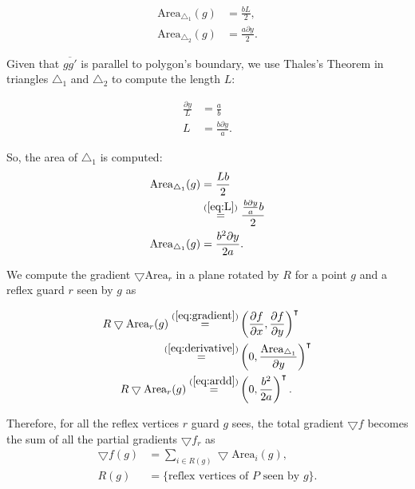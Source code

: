 \begin{align*}
    \text{Area}_{\triangle_1}(g) &= \frac{b L}{2},\\ 
    \text{Area}_{\triangle_2}(g) &= \frac{a \partial y}{2}.
\end{align*}


Given that $\overline{gg'}$ is parallel to polygon's boundary, we  use Thales's Theorem \cite{allman1889greek} in triangles $\triangle_1$ and $\triangle_2$ to compute the length $L$: 

\begin{align}
    \frac{\partial y}{L} &= \frac a b \nonumber \\ 
    L &= \frac{b \partial y}{a}. \label{eq:L}
\end{align}

So, the area of $\triangle_1$ is computed:
\begin{align}
    \text{Area}_{\triangle_1}(g) &= \frac{Lb}{2} \nonumber \\ 
    &\overset{(\ref{eq:L})}{=} \frac{\frac{b \partial y}{a}b}{2} \nonumber \\ 
    \text{Area}_{\triangle_1}(g) &= \frac{b^2 \partial y}{2a}. \label{eq:ardd}
\end{align}

We compute the gradient $\bigtriangledown \text{Area}_r$ in a plane rotated by $R$ for a point $g$ and a reflex guard $r$ seen by $g$ as

\begin{align}
    R\bigtriangledown \text{Area}_r(g) \overset{(\ref{eq:gradient})}{=} &\left(\frac{\partial f}{\partial x}, \frac{\partial f}{\partial y}\right)^\intercal \nonumber \\
    \overset{(\ref{eq:derivative})}{=} &\left(0, \frac{\text{Area}_{\triangle_1}}{\partial y}\right)^\intercal \nonumber \\
    R\bigtriangledown \text{Area}_r(g) \overset{(\ref{eq:ardd})}{=} &\left(0, \frac{b^2}{2a}\right)^\intercal. \label{eq:normf1}
\end{align}


Therefore, for all the reflex vertices $r$ guard $g$ sees, the total gradient $\bigtriangledown f$ becomes the sum of all the partial gradients $\bigtriangledown f_r$ as 
\begin{align}
    \bigtriangledown f(g) &= \sum_{i \in R(g)} \bigtriangledown \text{Area}_i(g), \label{eq:normf2} \\ 
    R(g) &= \{\text{reflex vertices of } P \text{ seen by }g\}. \nonumber
\end{align}

